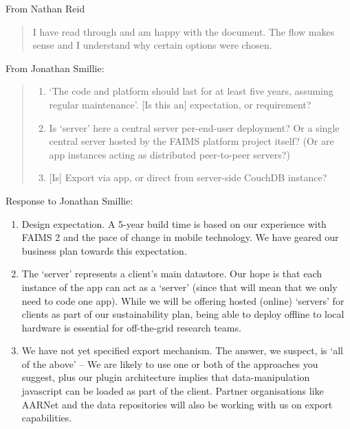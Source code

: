 \documentclass[a4paper,headings=small fontsize=10pt]{scrreprt}
\begin{document}
From Nathan Reid
\begin{quote}
I have read through and am happy with the document. The flow makes sense
and I understand why certain options were chosen.
\end{quote}

From Jonathan Smillie:
\begin{quote}
 \begin{enumerate}[itemsep=1em]
\item `The code and platform should last for at least five years, assuming 
   regular maintenance'. {[}Is this an{]} expectation, or requirement?

\item Is `server' here a central server per-end-user deployment? Or a single 
   central server hosted by the FAIMS platform project itself? 
   (Or are app instances acting as distributed peer-to-peer servers?)

\item {[}Is{]} Export via app, or direct from server-side CouchDB instance?

\end{enumerate}
\end{quote}

Response to Jonathan Smillie:

 \begin{enumerate}[itemsep=1em]

\item Design expectation. A 5-year build time is based on our experience with FAIMS 2 and the 
   pace of change in mobile technology. We have geared our business plan towards this expectation.

\item The `server' represents a client's main datastore. Our hope is that each 
   instance of the app can act as a `server' (since that will mean that we only 
   need to code one app). While we will be offering hosted (online) `servers' for clients as part of our sustainability plan, 
   being able to deploy offline to local hardware is essential for off-the-grid research teams.

\item We have not yet specified export mechanism. The answer, we suspect, is `all of the above' -- 
   We are likely to use one or both of the approaches you suggest, plus our plugin architecture implies 
   that data-manipulation javascript can be loaded as part of the client. Partner organisations like AARNet
   and the data repositories will also be working with us on export capabilities. 

\end{enumerate}
\end{document}

